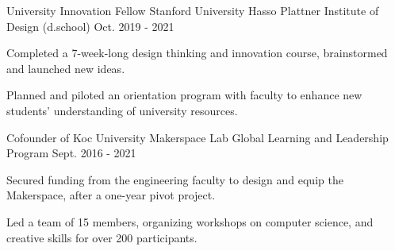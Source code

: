 \begin{cventries}
  \cvopenentry
    {University Innovation Fellow} %
    {Stanford University Hasso Plattner Institute of Design (d.school) } %
    {} %
    {Oct. 2019 - 2021} %
    {
    \begin{cvitems} %
        \item {Completed a 7-week-long design thinking and innovation course, brainstormed and launched new ideas.}
        \item {Planned and piloted an orientation program with faculty to enhance new students' understanding of university resources.}
     \end{cvitems}
    }
  \cvopenentry
    {Cofounder of Koc University Makerspace Lab} %
    {Global Learning and Leadership Program} %
    {} %
    {Sept. 2016 - 2021} %
    {
      \begin{cvitems} %
        \item {Secured funding from the engineering faculty to design and equip the Makerspace, after a one-year pivot project.}
        \item {Led a team of 15 members, organizing workshops on computer science, and creative skills for over 200 participants.}

\end{cvitems}}
\end{cventries}
